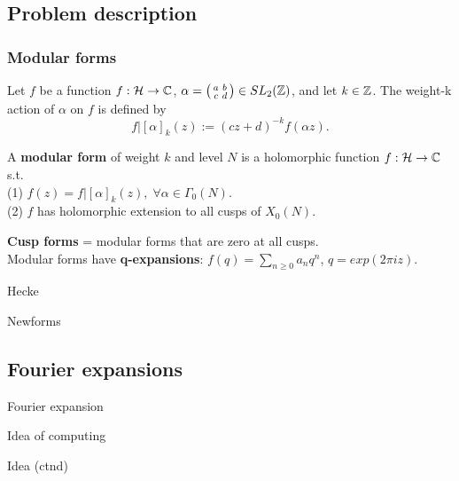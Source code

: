 \documentclass[handout]{beamer}
\begin{document}
\subsection{Problem description}

\begin{frame}
\frametitle{Modular forms}
Let $f$ be a function $f: \mathcal{H} \to \mathbb{C}$,  $\alpha  = \left( \begin{smallmatrix}a&b\\c&d\end{smallmatrix}\right) \in SL_2(\mathbb{Z})$, and let $k \in \mathbb{Z}$. The weight-k action of $\alpha$ on $f$ is
defined by
\[
	f|[\alpha]_k(z) := (cz+d)^{-k}f(\alpha z).
\]

\pause

\begin{Def}
A \textbf{modular form} of weight $k$ and level $N$ is a holomorphic function $f: \mathcal{H} \to \mathbb{C}$ s.t. \\
(1) $f(z)  = f|[\alpha]_k(z), \; \forall \alpha \in \Gamma_0(N)$. \\
(2) $f$ has holomorphic extension to all cusps of $X_0(N)$. \\
\end{Def}

\pause

{\bf Cusp forms} = modular forms that are zero at all cusps. \\
Modular forms have {\bf q-expansions}: $f(q) = \sum_{n \geq 0} a_n q^n$, $q = exp(2\pi i z)$.
\end{frame}


\begin{frame}{Hecke}

\end{frame}

\begin{frame}{Newforms}

\end{frame}

\subsection{Fourier expansions}

\begin{frame}{Fourier expansion}

\end{frame}

\begin{frame}{Idea of computing}

\end{frame}


\begin{frame}{Idea (ctnd)}

\end{frame}
\end{document}
